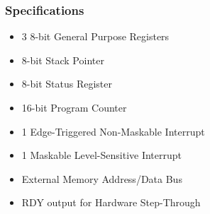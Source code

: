 \documentclass{beamer}
\begin{document}
\begin{frame}
\frametitle{Specifications}
\begin{itemize}
\item 3 8-bit General Purpose Registers
\item 8-bit Stack Pointer
\item 8-bit Status Register
\item 16-bit Program Counter
\item 1 Edge-Triggered Non-Maskable Interrupt
\item 1 Maskable Level-Sensitive Interrupt
\item External Memory Address/Data Bus
\item RDY output for Hardware Step-Through
\end{itemize}
\end{frame}
\end{document}
